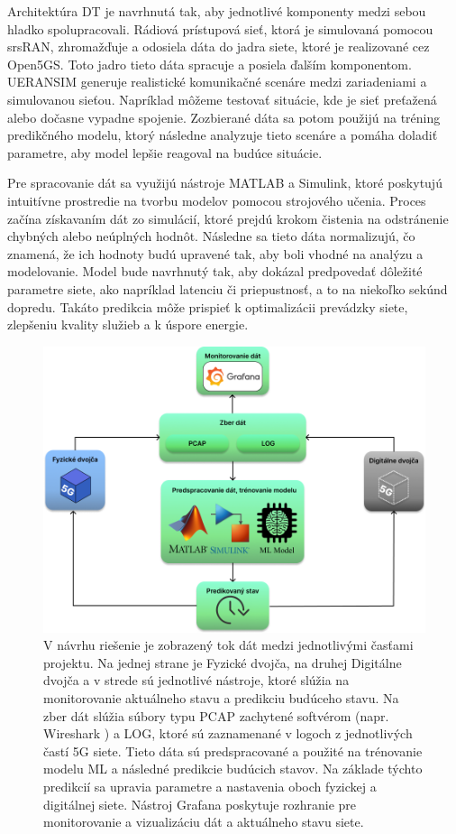 \par{
Architektúra DT je navrhnutá tak, aby jednotlivé komponenty medzi sebou hladko spolupracovali. Rádiová prístupová sieť, ktorá je simulovaná pomocou srsRAN, zhromažďuje a odosiela dáta do jadra siete, ktoré je realizované cez Open5GS. Toto jadro tieto dáta spracuje a posiela ďalším komponentom. UERANSIM generuje realistické komunikačné scenáre medzi zariadeniami a simulovanou sieťou. Napríklad môžeme testovať situácie, kde je sieť preťažená alebo dočasne vypadne spojenie. Zozbierané dáta sa potom použijú na tréning predikčného modelu, ktorý následne analyzuje tieto scenáre a pomáha doladiť parametre, aby model lepšie reagoval na budúce situácie.
}

\par{
Pre spracovanie dát sa využijú nástroje MATLAB a Simulink, ktoré poskytujú intuitívne prostredie na tvorbu modelov pomocou strojového učenia. Proces začína získavaním dát zo simulácií, ktoré prejdú krokom čistenia na odstránenie chybných alebo neúplných hodnôt. Následne sa tieto dáta normalizujú, čo znamená, že ich hodnoty budú upravené tak, aby boli vhodné na analýzu a modelovanie. Model bude navrhnutý tak, aby dokázal predpovedať dôležité parametre siete, ako napríklad latenciu či priepustnosť, a to na niekoľko sekúnd dopredu. Takáto predikcia môže prispieť k optimalizácii prevádzky siete, zlepšeniu kvality služieb a k úspore energie.
}


\begin{figure}[H]
    \centering
    \includegraphics[width=0.8\linewidth]{assets/images/high-level-model.png}
    \caption{V návrhu riešenie je zobrazený tok dát medzi jednotlivými časťami projektu. Na jednej strane je Fyzické dvojča, na druhej Digitálne dvojča a v strede sú jednotlivé nástroje, ktoré slúžia na monitorovanie aktuálneho stavu a predikciu budúceho stavu. Na zber dát slúžia súbory typu PCAP zachytené softvérom (napr. Wireshark \cite{wireshark}) a LOG, ktoré sú zaznamenané v logoch z jednotlivých častí 5G siete. Tieto dáta sú predspracované a použité na trénovanie modelu ML a následné predikcie budúcich stavov. Na základe týchto predikcií sa upravia parametre a nastavenia oboch fyzickej a digitálnej siete. Nástroj Grafana \cite{grafana} poskytuje rozhranie pre monitorovanie a vizualizáciu dát a aktuálneho stavu siete.}
    \label{fig:solution}
\end{figure}

